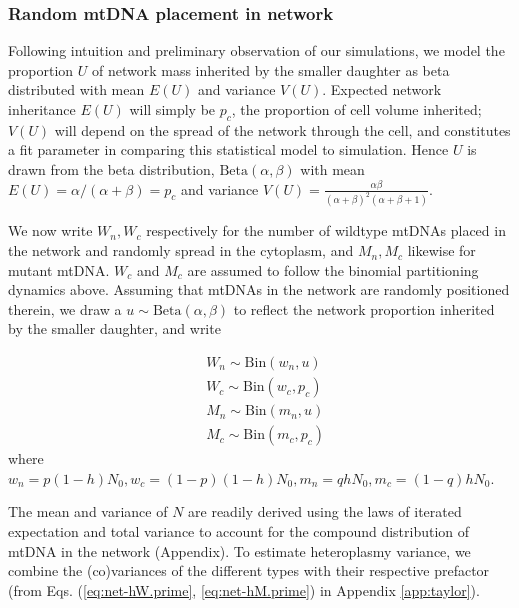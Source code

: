 \documentclass{article}
\newcommand{\be}{\begin{equation}}
\newcommand{\ee}{\end{equation}}
\begin{document}
\subsubsection*{Random mtDNA placement in network}
Following intuition and preliminary observation of our simulations, we model the proportion $U$ of network mass inherited by the smaller daughter as beta distributed with mean $E(U)$ and variance $V(U)$. Expected network inheritance $E(U)$ will simply be $p_c$, the proportion of cell volume inherited; $V(U)$ will depend on the spread of the network through the cell, and constitutes a fit parameter in comparing this statistical model to simulation. Hence $U$ is drawn from the beta distribution, $\mathrm{Beta}(\alpha,\beta)$ with mean $E(U) = \alpha/(\alpha+\beta) = p_c$ and variance $V(U) = \frac{\alpha\beta}{(\alpha+\beta)^2(\alpha+\beta+1)}$.

We now write $W_n, W_c$ respectively for the number of wildtype mtDNAs placed in the network and randomly spread in the cytoplasm, and $M_n, M_c$ likewise for mutant mtDNA. $W_c$ and $M_c$ are assumed to follow the binomial partitioning dynamics above. Assuming that mtDNAs in the network are randomly positioned therein, we draw a $u\sim \mathrm{Beta}(\alpha,\beta)$ to reflect the network proportion inherited by the smaller daughter, and write

\be\label{eq:methods-model}
    \begin{split}
        & W_n \sim \mathrm{Bin}\left(w_n,u\right) \\
        & W_c \sim \mathrm{Bin}\left(w_c,p_c\right) \\
        & M_n \sim \mathrm{Bin}\left(m_n,u\right) \\
        & M_c \sim \mathrm{Bin}\left(m_c,p_c\right)
    \end{split}
\ee
where $w_n = p(1-h)N_0, w_c = (1-p)(1-h)N_0, m_n = qhN_0, m_c = (1-q)hN_0$.

The mean and variance of $N$ are readily derived using the laws of iterated expectation and total variance to account for the compound distribution of mtDNA in the network (Appendix). To estimate heteroplasmy variance, we combine the (co)variances of the different types with their respective prefactor (from Eqs. (\ref{eq:net-hW.prime}, \ref{eq:net-hM.prime}) in Appendix \ref{app:taylor}).
\end{document}
